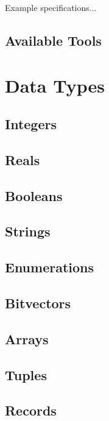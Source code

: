 \documentclass{book}
\begin{document}
Example specifications...

\section{Available Tools}

\chapter{Data Types}

\section{Integers}

\section{Reals}

\section{Booleans}

\section{Strings}

\section{Enumerations}

\section{Bitvectors}

\section{Arrays}

\section{Tuples}

\section{Records}
\end{document}
